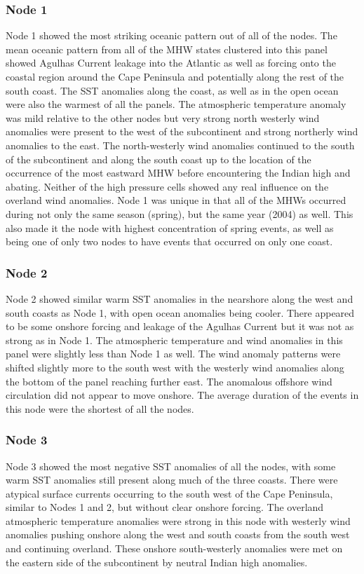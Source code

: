 \documentclass[utf8]{frontiersSCNS}
\begin{document}








\subsubsection{Node 1}
Node 1 showed the most striking oceanic pattern out of all of the nodes. The mean oceanic pattern from all of the MHW states clustered into this panel showed Agulhas Current leakage into the Atlantic as well as forcing onto the coastal region around the Cape Peninsula and potentially along the rest of the south coast. The SST anomalies along the coast, as well as in the open ocean were also the warmest of all the panels. The atmospheric temperature anomaly was mild relative to the other nodes but very strong north westerly wind anomalies were present to the west of the subcontinent and strong northerly wind anomalies to the east. The north-westerly wind anomalies continued to the south of the subcontinent and along the south coast up to the location of the occurrence of the most eastward MHW before encountering the Indian high and abating. Neither of the high pressure cells showed any real influence on the overland wind anomalies. Node 1 was unique in that all of the MHWs occurred during not only the same season (spring), but the same year (2004) as well. This also made it the node with highest concentration of spring events, as well as being one of only two nodes to have events that occurred on only one coast.

\subsubsection{Node 2}
Node 2 showed similar warm SST anomalies in the nearshore along the west and south coasts as Node 1, with open ocean anomalies being cooler. There appeared to be some onshore forcing and leakage of the Agulhas Current but it was not as strong as in Node 1. The atmospheric temperature and wind anomalies in this panel were slightly less than Node 1 as well. The wind anomaly patterns were shifted slightly more to the south west with the westerly wind anomalies along the bottom of the panel reaching further east. The anomalous offshore wind circulation did not appear to move onshore. The average duration of the events in this node were the shortest of all the nodes.

\subsubsection{Node 3}
Node 3 showed the most negative SST anomalies of all the nodes, with some warm SST anomalies still present along much of the three coasts. There were atypical surface currents occurring to the south west of the Cape Peninsula, similar to Nodes 1 and 2, but without clear onshore forcing. The overland atmospheric temperature anomalies were strong in this node with westerly wind anomalies pushing onshore along the west and south coasts from the south west and continuing overland. These onshore south-westerly anomalies were met on the eastern side of the subcontinent by neutral Indian high anomalies.
\end{document}

